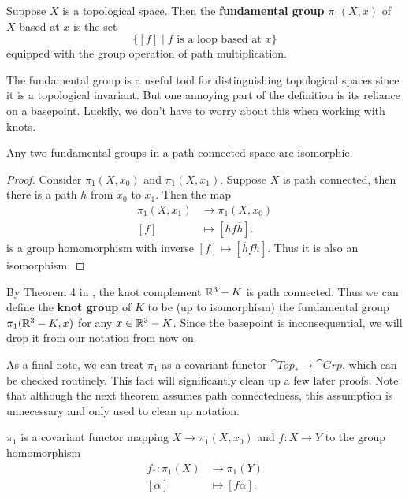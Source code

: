 \documentclass[twoside,10pt]{article}
\begin{document}
\begin{defn}[]
	Suppose $X$ is a topological space. Then the \textbf{fundamental group} $\pi_1(X,x)$ of $X$ based at $x$ is the set
	\[
		\Big\{ [f] \;\Big|\; f \text{ is a loop based at } x \Big\}
	\] equipped with the group operation of path multiplication.
\end{defn}

The fundamental group is a useful tool for distinguishing topological spaces since it is a topological invariant. But one annoying part of the definition is its reliance on a basepoint. Luckily, we don't have to worry about this when working with knots.

\begin{prop}
Any two fundamental groups in a path connected space are isomorphic.
\end{prop}
\begin{proof}
	Consider $\pi_1(X,x_0)$ and $\pi_1(X,x_1)$. Suppose $X$ is path connected, then there is a path $h$ from $x_0$ to $x_1$. Then the map
        \begin{align*}
                \pi_1(X,x_1) &\to \pi_1(X,x_0) \\
                [f] &\mapsto [h f \overline{h}].
        \end{align*}
	is a group homomorphism with inverse $[f] \mapsto [\overline{h}fh]$. Thus it is also an isomorphism.
\end{proof}

By Theorem 4 in \cite{hur}, the knot complement $\mathbb{R}^{3}-K$ is path connected. Thus we can define the \textbf{knot group} of $K$ to be (up to isomorphism) the fundamental group $\pi_1(\mathbb{R}^{3}-K, x)$ for any $x \in \mathbb{R}^{3}-K$. Since the basepoint is inconsequential, we will drop it from our notation from now on.

As a final note, we can treat $\pi_1$ as a covariant functor $\cat{Top}_*\to \cat{Grp}$, which can be checked routinely. This fact will significantly clean up a few later proofs. Note that although the next theorem assumes path connectedness, this assumption is unnecessary and only used to clean up notation.

\begin{thrm}[]
	$\pi_1$ is a covariant functor mapping $X \to \pi_1(X,x_0)$ and $f:X\to Y$ to the group homomorphism
	\begin{align*}
		f_{*}: \pi_1(X) &\to \pi_1(Y) \\
		[\alpha] &\mapsto [f\alpha].
	\end{align*}
\end{thrm}
\end{document}
